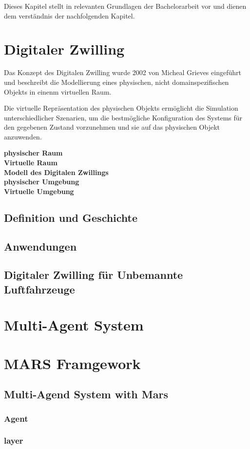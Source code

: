 
Dieses Kapitel stellt in relevanten Grundlagen der Bachelorarbeit vor und dienen dem verständnis der nachfolgenden Kapitel. 

\section{Digitaler Zwilling}

    Das Konzept des Digitalen Zwilling wurde 2002 von Micheal Grieves eingeführt und beschreibt die Modellierung eines physischen, nicht domainspezifischen Objekts in einenm virtuellen Raum.  

    Die virtuelle Repräsentation des physischen Objekts ermöglicht die Simulation unterschiedlicher Szenarien, um die bestmögliche Konfiguration des Systems für den gegebenen Zustand vorzunehmen und sie auf das physischen Objekt anzuwenden. 

    \textbf{physischer Raum} \\

    \textbf{Virtuelle Raum} \\

    \textbf{Modell des Digitalen Zwillings} \\

    \textbf{physischer Umgebung} \\

    \textbf{Virtuelle Umgebung} \\

    \subsection{Definition und Geschichte}

    \subsection{Anwendungen}

    \subsection{Digitaler Zwilling für Unbemannte Luftfahrzeuge}

\section{Multi-Agent System}

\section{MARS Framgework}

    \subsection{Multi-Agend System with Mars}

    \subsubsection{Agent}

    \subsubsection{layer}



